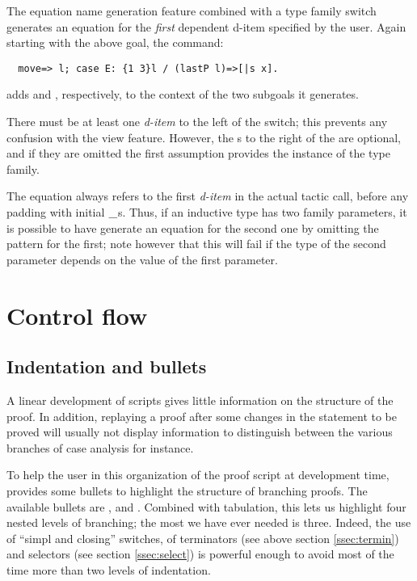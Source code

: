 The equation name generation feature combined with a type family \ssrC{/}
  switch generates an equation for the \emph{first} dependent d-item
specified by the user.
Again starting with the above goal, the command:
\begin{lstlisting}
  move=> l; case E: {1 3}l / (lastP l)=>[|s x].
\end{lstlisting}
adds  and ,
respectively, to the context of the two subgoals it generates.

There must be at least one \emph{d-item} to the left of the \ssrC{/}
switch; this prevents any
confusion with the view feature. However, the \ditem{}s to the right of
the \ssrC{/} are optional, and if they are omitted the first assumption
provides the instance of the type family.

The equation always refers to the first \emph{d-item} in the actual
tactic call, before any padding with initial $\ssrC{\_}$s. Thus, if an
inductive type has two family parameters, it is possible to have
\ssr{} generate an equation for the second one by omitting the pattern
for the first; note however that this will fail if the type of the
second parameter depends on the value of the first parameter.
\section{Control flow}
\subsection{Indentation and bullets}\label{ssec:indent}

A linear development of \Coq{} scripts gives little information on
the structure of the proof. In addition, replaying a proof after some
changes in the statement to be proved will usually not display information to
distinguish between the various branches of case analysis for instance.

To help the user in this organization of the proof script at
development time, \ssr{} provides some bullets to highlight the
structure of branching proofs. The available bullets are \ssrC{-},
\ssrC{+} and \ssrC{*}. Combined with tabulation, this lets us highlight four
nested levels of branching; the most we have ever
needed is three. Indeed, the use of ``simpl and closing'' switches, of
terminators (see above section \ref{ssec:termin}) and selectors (see
 section \ref{ssec:select}) is powerful enough
to avoid most of the time more than two levels of indentation.


